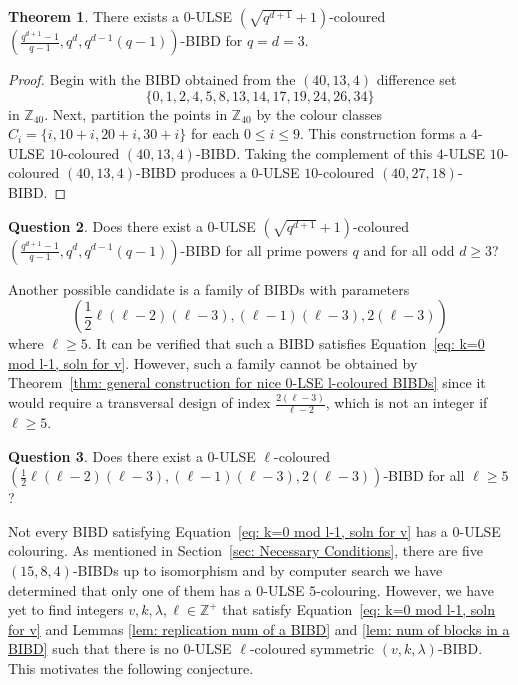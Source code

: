 \documentclass[12pt]{article}
\theoremstyle{definition}
\newtheorem{theorem}{Theorem}[section]
\newtheorem{question}[theorem]{Question}
\begin{document}
\begin{theorem}\label{thm: there exists a 0-ULSE (40,27,18)-BIBD}
    There exists a $0$-ULSE $\left(\sqrt{q^{d+1}} + 1\right)$-coloured $\left(\frac{q^{d+1} - 1}{q-1}, q^d, q^{d-1}(q-1)\right)$-BIBD for $q = d = 3$.
\end{theorem}

\begin{proof}
    Begin with the BIBD obtained from the $(40, 13, 4)$ difference set \[\{0,1,2,4,5,8,13,14,17,19,24,26,34\}\] in $\mathbb{Z}_{40}$. Next, partition the points in $\mathbb{Z}_{40}$ by the colour classes $C_i = \{i, 10 + i, 20 + i, 30 + i\}$ for each $0\leq i\leq 9$. This construction forms a $4$-ULSE $10$-coloured $(40,13,4)$-BIBD. Taking the complement of this $4$-ULSE $10$-coloured $(40,13,4)$-BIBD produces a $0$-ULSE $10$-coloured $(40,27,18)$-BIBD. 
\end{proof}

\begin{question}
    Does there exist a $0$-ULSE $(\sqrt{q^{d+1}} + 1)$-coloured $\left(\frac{q^{d+1} - 1}{q-1}, q^d, q^{d-1}(q-1)\right)$-BIBD for all prime powers $q$ and for all odd $d\geq 3$?
\end{question}

Another possible candidate is a family of BIBDs with parameters \[\left(\frac{1}{2}\ell(\ell-2)(\ell-3), (\ell-1)(\ell-3), 2(\ell-3)\right)\] where $\ell \geq 5$. It can be verified that such a BIBD satisfies Equation~\eqref{eq: k=0 mod l-1, soln for v}. However, such a family cannot be obtained by Theorem~\ref{thm: general construction for nice 0-LSE l-coloured BIBDs} since it would require a transversal design of index $\frac{2(\ell-3)}{\ell-2}$, which is not an integer if $\ell \geq 5$.

\begin{question}
    Does there exist a $0$-ULSE $\ell$-coloured $\left(\frac{1}{2}\ell(\ell-2)(\ell-3), (\ell-1)(\ell-3), 2(\ell-3)\right)$-BIBD for all $\ell\geq 5$?
\end{question}

Not every BIBD satisfying Equation~\eqref{eq: k=0 mod l-1, soln for v} has a $0$-ULSE colouring. As mentioned in Section~\ref{sec: Necessary Conditions}, there are five $(15,8,4)$-BIBDs up to isomorphism and by computer search we have determined that only one of them has a $0$-ULSE $5$-colouring. However, we have yet to find integers $v,k,\lambda, \ell \in \mathbb{Z}^+$ that satisfy Equation~\eqref{eq: k=0 mod l-1, soln for v} and Lemmas \ref{lem: replication num of a BIBD} and \ref{lem: num of blocks in a BIBD} such that there is no $0$-ULSE $\ell$-coloured symmetric $(v,k,\lambda)$-BIBD. This motivates the following conjecture.
\end{document}
